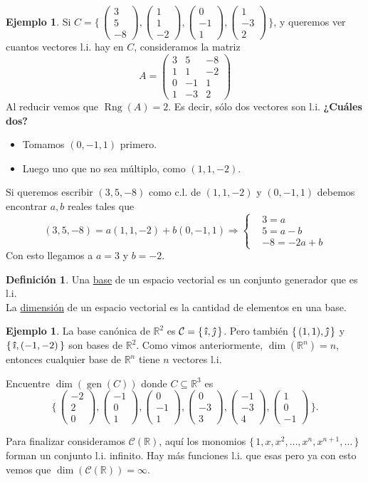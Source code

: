 \documentclass[12pt]{article}
\theoremstyle{plain}
\theoremstyle{definition}
\newtheorem*{Def}{Definición}       %
\newtheorem{Ex}[Th]{Ejemplo}           %
\theoremstyle{remark}
\DeclareMathOperator{\gen}{gen}     %
\DeclareMathOperator{\Rng}{Rng}     %
\newcommand{\ii}{\vu{\imath}}
\newcommand{\jj}{\vu{\jmath}}
\newcommand{\bR}{\mathbb{R}}        %
\newcommand{\cC}{\mathcal{C}}       %
\renewcommand{\:}{\colon}           %
\newcommand{\un}[1]{\underline{#1}}
\renewcommand{\.}{\Cdot}                %
\newcommand{\threebyone}[3]{\begin{pmatrix} %
  #1 \\ #2 \\ #3 \end{pmatrix}}
\newcommand{\To}{\Rightarrow}
\newcommand{\set}[1]{\{\,#1\,\}}    %
\newcommand{\Set}[1]{\biggl\{\,#1\,\biggr\}} %
\begin{document}
\begin{multicols}{2}
\begin{Ex}
Si $C=\Set{\threebyone{3}{5}{-8},\threebyone{1}{1}{-2},\threebyone{0}{-1}{1},\threebyone{1}{-3}{2}}$, y queremos ver cuantos vectores l.i. hay en $C$, consideramos la matriz
  $$A=\begin{pmatrix}
    3&5&-8\\1&1&-2\\ 0&-1&1\\ 1&-3&2
  \end{pmatrix}$$
  Al reducir vemos que $\Rng(A)=2$. Es decir, sólo dos vectores son l.i. \textbf{¿Cuáles dos?} \begin{itemize}
    \itemsep=-0.4em
    \item Tomamos $(0,-1,1)$ primero.
    \item Luego uno que no sea múltiplo, como $(1,1,-2)$.
  \end{itemize}
  Si queremos escribir $(3,5,-8)$ como c.l. de $(1,1,-2)$ y $(0,-1,1)$ debemos encontrar $a,b$ reales tales que 
  $$(3,5,-8)=a(1,1,-2)+b(0,-1,1)\To\left\lbrace\begin{aligned}
    &3=a\\
    &5=a-b\\
    &-8=-2a+b
  \end{aligned}\right.$$
  Con esto llegamos a $a=3$ y $b=-2$.
\end{Ex}

\begin{Def}
  Una \un{base} de un espacio vectorial es un conjunto generador que es l.i.\\
  La \un{dimensión} de un espacio vectorial es la cantidad de elementos en una base.
\end{Def}

\begin{Ex}
  La base canónica de $\bR^2$ es $\cC=\set{\ii,\jj}$. Pero también $\set{(1,1),\jj}$ y $\set{\ii,(-1,-2)}$ son bases de $\bR^2$. Como vimos anteriormente, $\dim(\bR^n)=n$, entonces cualquier base de $\bR^n$ tiene $n$ vectores l.i.
\end{Ex}
\begin{ptcbP}
Encuentre $\dim(\gen(C))$ donde $C\subseteq\bR^3$ es
$$\Set{\threebyone{-2}{2}{0},\threebyone{-1}{0}{1},\threebyone{0}{-1}{1},\threebyone{0}{-3}{3},\threebyone{-1}{-3}{4},\threebyone{1}{0}{-1}}.$$
\end{ptcbP}
Para finalizar consideramos $\cC(\bR)$, aquí los monomios $\set{1,x,x^2,\dots,x^n,x^{n+1},\dots}$ forman un conjunto l.i. infinito. Hay más funciones l.i. que esas pero ya con esto vemos que $\dim(\cC(\bR))=\infty$.
\end{multicols}
\end{document}
